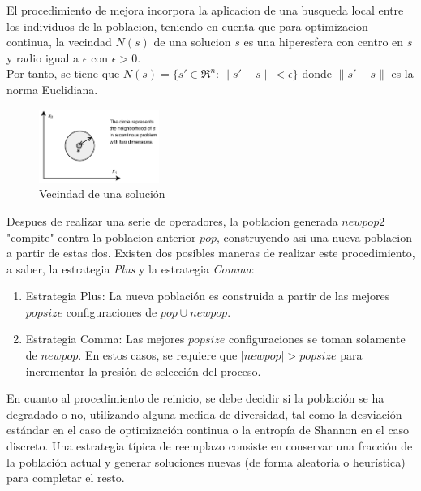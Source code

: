 \documentclass[10pt,journal,compsoc]{styles/IEEEtran}
\begin{document}
El procedimiento de mejora incorpora la aplicacion de una busqueda local entre los individuos de la poblacion, teniendo en cuenta que para optimizacion continua, la vecindad $N(s)$ de una solucion $s$ es una hiperesfera con centro en $s$ y radio igual a $\epsilon$ con $\epsilon>0$.\\

Por tanto, se tiene que $N(s)=\{s' \in \Re^n : \parallel s'-s\parallel <\epsilon\}$ donde $\parallel s'-s\parallel$ es la norma Euclidiana.\\
  
    \begin{figure}[H]
    \centering
    \includegraphics[width = 0.35\textwidth]{ls.png}
    \caption{Vecindad de una solución}
  	\end{figure}

Despues de realizar una serie de operadores, la poblacion generada $newpop2$ "compite" contra la poblacion anterior $pop$, construyendo asi una nueva poblacion a partir de estas dos. Existen dos posibles maneras de realizar este procedimiento, a saber, la estrategia \textit{Plus} y la estrategia \textit{Comma}:\\ 

	\begin{enumerate}
	\item Estrategia Plus: La nueva población es construida a partir de las mejores $popsize$ configuraciones de $pop \cup newpop$.\\
	\item Estrategia Comma: Las mejores $popsize$ configuraciones se toman solamente de $newpop$. En estos casos, se requiere que $|newpop| >popsize$ para incrementar la presión de selección del proceso.\\
	\end{enumerate}

En cuanto al procedimiento de reinicio, se debe decidir si la población se ha degradado o no, utilizando alguna medida de diversidad, tal como la desviación estándar en el caso de optimización continua o la entropía de Shannon en el caso discreto. Una estrategia típica de reemplazo consiste en conservar una fracción de la población actual y generar soluciones nuevas (de forma aleatoria o heurística) para completar el resto.\\
\end{document}
